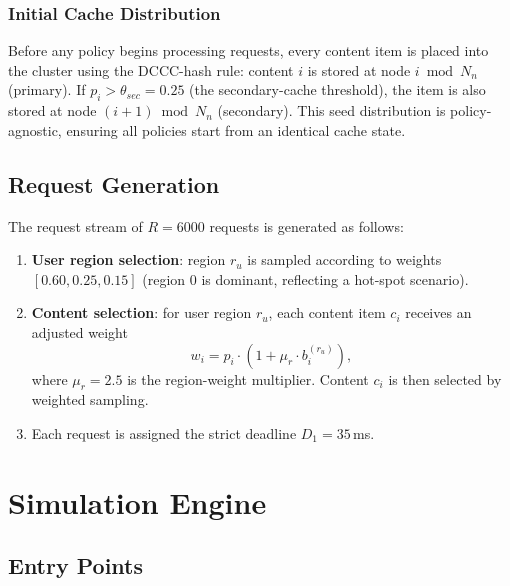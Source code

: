 \documentclass[12pt]{article}
\begin{document}
\subsubsection{Initial Cache Distribution}

Before any policy begins processing requests, every content item is placed into the cluster using the DCCC-hash rule: content $i$ is stored at node $i \bmod N_n$ (primary). If $p_i > \theta_{sec} = 0.25$ (the secondary-cache threshold), the item is also stored at node $(i+1) \bmod N_n$ (secondary). This seed distribution is policy-agnostic, ensuring all policies start from an identical cache state.

\subsection{Request Generation}

The request stream of $R = 6000$ requests is generated as follows:

\begin{enumerate}[noitemsep]
  \item \textbf{User region selection}: region $r_u$ is sampled according to weights $[0.60, 0.25, 0.15]$ (region 0 is dominant, reflecting a hot-spot scenario).
  \item \textbf{Content selection}: for user region $r_u$, each content item $c_i$ receives an adjusted weight
    \begin{equation}
      w_i = p_i \cdot \left(1 + \mu_r \cdot b_i^{(r_u)}\right),
    \end{equation}
    where $\mu_r = 2.5$ is the region-weight multiplier. Content $c_i$ is then selected by weighted sampling.
  \item Each request is assigned the strict deadline $D_1 = 35$\,ms.
\end{enumerate}

\section{Simulation Engine}
\label{sec:engine}

\subsection{Entry Points}
\end{document}
